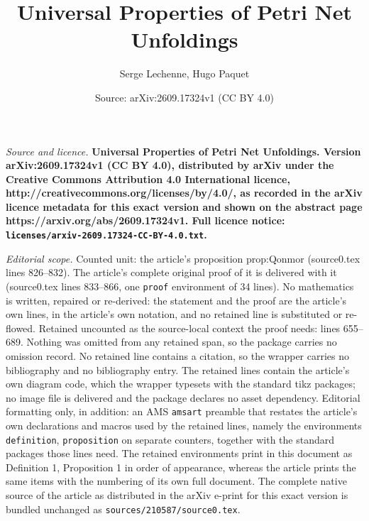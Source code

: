 \documentclass[10pt,a4paper]{amsart}
\title{\bfseries Universal Properties of Petri Net Unfoldings}
\author{Serge Lechenne, Hugo Paquet}
\date{Source: arXiv:2609.17324v1 (CC BY 4.0)}
\begin{document}
\maketitle

\noindent\emph{Source and licence.} \bfseries Universal Properties of Petri Net Unfoldings. Version arXiv:2609.17324v1 (CC BY 4.0), distributed by arXiv under the Creative Commons Attribution 4.0 International licence, http://creativecommons.org/licenses/by/4.0/, as recorded in the arXiv licence metadata for this exact version and shown on the abstract page https://arxiv.org/abs/2609.17324v1. Full licence notice: \texttt{licenses/arxiv-2609.17324-CC-BY-4.0.txt}.\par\smallskip

\noindent\textit{Editorial scope.} Counted unit: the article's proposition prop:Qonmor (source0.tex lines 826--832). The article's complete original proof of it is delivered with it (source0.tex lines 833--866, one \texttt{proof} environment of 34 lines). No mathematics is written, repaired or re-derived: the statement and the proof are the article's own lines, in the article's own notation, and no retained line is substituted or re-flowed.  Retained uncounted as the source-local context the proof needs: lines 655--689.  Nothing was omitted from any retained span, so the package carries no omission record.  No retained line contains a citation, so the wrapper carries no bibliography and no bibliography entry.  The retained lines contain the article's own diagram code, which the wrapper typesets with the standard tikz packages; no image file is delivered and the package declares no asset dependency.  Editorial formatting only, in addition: an AMS \texttt{amsart} preamble that restates the article's own declarations and macros used by the retained lines, namely the environments \texttt{definition}, \texttt{proposition} on separate counters, together with the standard packages those lines need.  The retained environments print in this document as Definition 1, Proposition 1 in order of appearance, whereas the article prints the same items with the numbering of its own full document.  The complete native source of the article as distributed in the arXiv e-print for this exact version is bundled unchanged as \texttt{sources/210587/source0.tex}.
\end{document}
